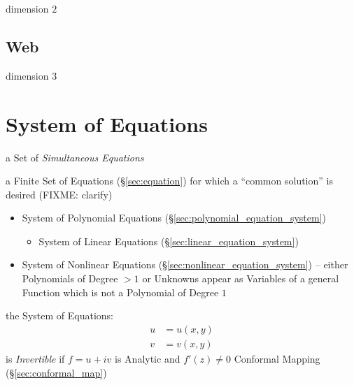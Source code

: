 dimension $2$




\subsection{Web}\label{sec:web}

dimension $3$



\section{System of Equations}\label{sec:equation_system}

a Set of \emph{Simultaneous Equations}

a Finite Set of Equations (\S\ref{sec:equation}) for which a ``common
solution'' is desired (FIXME: clarify)

\begin{itemize}
  \item System of Polynomial Equations (\S\ref{sec:polynomial_equation_system})
  \begin{itemize}
    \item System of Linear Equations (\S\ref{sec:linear_equation_system})
  \end{itemize}
  \item System of Nonlinear Equations
    (\S\ref{sec:nonlinear_equation_system}) -- either Polynomials of Degree
    $>1$ or Unknowns appear as Variables of a general Function which is not a
    Polynomial of Degree $1$
\end{itemize}


the System of Equations:
\begin{align*}
  u & = u(x,y) \\
  v & = v(x,y)
\end{align*}
is \emph{Invertible} if $f = u + iv$ is Analytic and $f'(z) \neq 0$ \fist
Conformal Mapping (\S\ref{sec:conformal_map})

